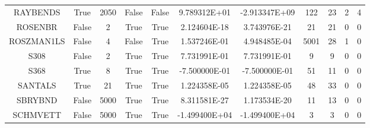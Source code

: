 \begin{longtable}{ccccccccccc}
	\cellcolor{default2} RAYBENDS& \cellcolor{default2} True& \cellcolor{default2} 2050& \cellcolor{default2} False& \cellcolor{default2} False& \cellcolor{poor} 9.789312E+01& \cellcolor{best} -2.913347E+09& \cellcolor{poor} 122& \cellcolor{best} 23& \cellcolor{default2} 2& \cellcolor{default2} 4\\
	\cellcolor{default1} ROSENBR& \cellcolor{default1} False& \cellcolor{default1} 2& \cellcolor{default1} True& \cellcolor{default1} True& \cellcolor{ok} 2.124604E-18& \cellcolor{best} 3.743976E-21& \cellcolor{best} 21& \cellcolor{best} 21& \cellcolor{default1} 0& \cellcolor{default1} 0\\
	\cellcolor{default2} ROSZMAN1LS& \cellcolor{default2} False& \cellcolor{default2} 4& \cellcolor{default2} False& \cellcolor{default2} True& \cellcolor{poor} 1.537246E-01& \cellcolor{best} 4.948485E-04& \cellcolor{poor} 5001& \cellcolor{best} 28& \cellcolor{default2} 1& \cellcolor{default2} 0\\
	\cellcolor{default1} S308& \cellcolor{default1} False& \cellcolor{default1} 2& \cellcolor{default1} True& \cellcolor{default1} True& \cellcolor{best} 7.731991E-01& \cellcolor{ok} 7.731991E-01& \cellcolor{best} 9& \cellcolor{best} 9& \cellcolor{default1} 0& \cellcolor{default1} 0\\
	\cellcolor{default2} S368& \cellcolor{default2} True& \cellcolor{default2} 8& \cellcolor{default2} True& \cellcolor{default2} True& \cellcolor{ok} -7.500000E-01& \cellcolor{best} -7.500000E-01& \cellcolor{poor} 51& \cellcolor{best} 11& \cellcolor{default2} 0& \cellcolor{default2} 0\\
	\cellcolor{default1} SANTALS& \cellcolor{default1} True& \cellcolor{default1} 21& \cellcolor{default1} True& \cellcolor{default1} True& \cellcolor{ok} 1.224358E-05& \cellcolor{best} 1.224358E-05& \cellcolor{ok} 48& \cellcolor{best} 33& \cellcolor{default1} 0& \cellcolor{default1} 0\\
	\cellcolor{default2} SBRYBND& \cellcolor{default2} False& \cellcolor{default2} 5000& \cellcolor{default2} True& \cellcolor{default2} True& \cellcolor{best} 8.311581E-27& \cellcolor{ok} 1.173534E-20& \cellcolor{best} 11& \cellcolor{ok} 13& \cellcolor{default2} 0& \cellcolor{default2} 0\\
	\cellcolor{default1} SCHMVETT& \cellcolor{default1} False& \cellcolor{default1} 5000& \cellcolor{default1} True& \cellcolor{default1} True& \cellcolor{best} -1.499400E+04& \cellcolor{best} -1.499400E+04& \cellcolor{best} 3& \cellcolor{best} 3& \cellcolor{default1} 0& \cellcolor{default1} 0\\

\end{longtable}
